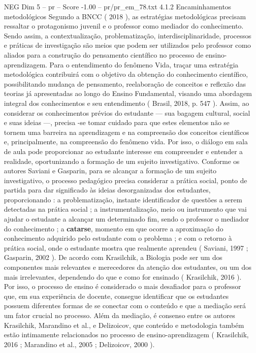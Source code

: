 \begin{textsample}{NEG Dim 5 – pr – Score -1.00 – pr/pr\_em\_78.txt}  \label{ex:f5_neg_233}
4.1.2 Encaminhamentos metodológicos Segundo a BNCC ( 2018 ), as estratégias metodológicas precisam ressaltar o protagonismo juvenil e o professor como mediador do conhecimento.
Sendo assim, a contextualização, problematização, interdisciplinaridade, processos e práticas de investigação são meios que podem ser utilizados pelo professor como aliados para a construção do pensamento científico no processo de ensino-aprendizagem.
Para o entendimento do fenômeno Vida, traçar uma estratégia metodológica contribuirá com o objetivo da obtenção do conhecimento científico, possibilitando mudança de pensamento, reelaboração de conceitos e reflexão das teorias já apresentadas ao longo do Ensino Fundamental, visando uma abordagem integral dos conhecimentos e seu entendimento ( Brasil, 2018, p. 547 ).
Assim, ao considerar os conhecimentos prévios do estudante — sua bagagem cultural, social e suas ideias —, precisa -se tomar cuidado para que estes elementos não se tornem uma barreira na aprendizagem e na compreensão dos conceitos científicos e, principalmente, na compreensão do fenômeno vida.
Por isso, o diálogo em sala de aula pode proporcionar ao estudante interesse em compreender e entender a realidade, oportunizando a formação de um sujeito investigativo.
Conforme os autores Saviani e Gasparin, para se alcançar a formação de um sujeito investigativo, o processo pedagógico precisa considerar a prática social, ponto de partida para dar significado às ideias desorganizadas dos estudantes, proporcionando : a problematização, instante identificador de questões a serem detectadas na prática social ; a instrumentalização, meio ou instrumento que vai ajudar o estudante a alcançar um determinado fim, sendo o professor o mediador do conhecimento ; a \textbf{catarse}, momento em que ocorre a aproximação do conhecimento adquirido pelo estudante com o problema ; e com o retorno à prática social, onde o estudante mostra que realmente aprendeu ( Saviani, 1997 ; Gasparin, 2002 ).
De acordo com Krasilchik, a Biologia pode ser um dos componentes mais relevantes e merecedores da atenção dos estudantes, ou um dos mais irrelevantes, dependendo do que e como for ensinado ( Krasilchik, 2016 ).
Por isso, o processo de ensino é considerado o mais desafiador para o professor que, em sua experiência de docente, consegue identificar que os estudantes possuem diferentes formas de se conectar com o conteúdo e que a mediação será um fator crucial no processo.
Além da mediação, é consenso entre os autores Krasilchik, Marandino et al., e Delizoicov, que conteúdo e metodologia também estão intimamente relacionados no processo de ensino-aprendizagem ( Krasilchik, 2016 ; Marandino et al., 2005 ; Delizoicov, 2000 ).

\end{textsample}
